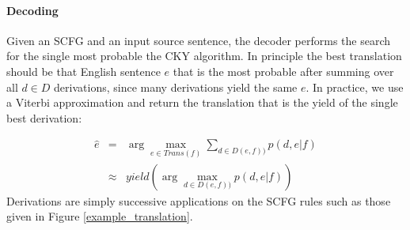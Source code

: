 \documentclass[11pt]{article}
\begin{document}
\paragraph{Decoding}

Given an SCFG and an input source sentence, the decoder performs the search for the single most probable the CKY algorithm.  In principle the best translation should be that English sentence $e$ that is the most probable after summing over all  $d\in D$ derivations, since many derivations yield the same $e$.  In practice, we use a Viterbi approximation and return the translation that is the yield of the single best derivation:

\begin{eqnarray}
  \hat{e} &=& \arg \max_{e\in Trans(f)} \sum_{d\in D(e,f))}{p(d,e|f)}\\
             &\approx& yield(\arg \max_{d\in D(e,f))}{p(d,e|f)})
\end{eqnarray}
%
Derivations are simply successive applications on the SCFG rules such as
those given in Figure \ref{example_translation}.  
\end{document}
